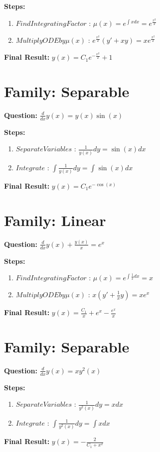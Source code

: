 \documentclass{article}
\begin{document}
\textbf{Steps:}
\begin{enumerate}
\item $Find Integrating Factor$ :  $\mu(x) = e^{\int x dx} = e^{\frac{x^{2}}{2}}$
\item $Multiply ODE by \mu(x)$ :  $e^{\frac{x^{2}}{2}}(y' + xy) = x e^{\frac{x^{2}}{2}}$
\end{enumerate}
\textbf{Final Result:} $y{\left(x \right)} = C_{1} e^{- \frac{x^{2}}{2}} + 1$

\section*{Family: Separable}
\textbf{Question:} $\frac{d}{d x} y{\left(x \right)} = y{\left(x \right)} \sin{\left(x \right)}$

\textbf{Steps:}
\begin{enumerate}
\item $Separate Variables$ :  $\frac{1}{y{\left(x \right)}} dy = \sin{\left(x \right)} dx$
\item $Integrate$ :  $\int \frac{1}{y{\left(x \right)}} dy = \int \sin{\left(x \right)} dx$
\end{enumerate}
\textbf{Final Result:} $y{\left(x \right)} = C_{1} e^{- \cos{\left(x \right)}}$

\section*{Family: Linear}
\textbf{Question:} $\frac{d}{d x} y{\left(x \right)} + \frac{y{\left(x \right)}}{x} = e^{x}$

\textbf{Steps:}
\begin{enumerate}
\item $Find Integrating Factor$ :  $\mu(x) = e^{\int \frac{1}{x} dx} = x$
\item $Multiply ODE by \mu(x)$ :  $x(y' + \frac{1}{x}y) = x e^{x}$
\end{enumerate}
\textbf{Final Result:} $y{\left(x \right)} = \frac{C_{1}}{x} + e^{x} - \frac{e^{x}}{x}$

\section*{Family: Separable}
\textbf{Question:} $\frac{d}{d x} y{\left(x \right)} = x y^{2}{\left(x \right)}$

\textbf{Steps:}
\begin{enumerate}
\item $Separate Variables$ :  $\frac{1}{y^{2}{\left(x \right)}} dy = x dx$
\item $Integrate$ :  $\int \frac{1}{y^{2}{\left(x \right)}} dy = \int x dx$
\end{enumerate}
\textbf{Final Result:} $y{\left(x \right)} = - \frac{2}{C_{1} + x^{2}}$
\end{document}
